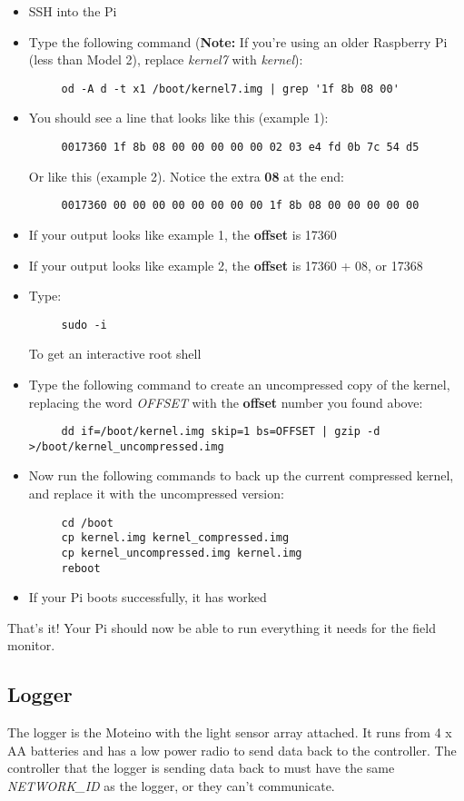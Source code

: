 \documentclass[10pt]{article}
\begin{document}
\begin{itemize}
 \item SSH into the Pi
 \item Type the following command (\textbf{Note:} If you're using an older Raspberry Pi (less than Model 2), replace \textit{kernel7} with \textit{kernel}):
	\begin{verbatim}
	 od -A d -t x1 /boot/kernel7.img | grep '1f 8b 08 00'
	\end{verbatim}
  \item You should see a line that looks like this (example 1):
	\begin{verbatim}
	 0017360 1f 8b 08 00 00 00 00 00 02 03 e4 fd 0b 7c 54 d5
	\end{verbatim}
	Or like this (example 2). Notice the extra \textbf{08} at the end:
	\begin{verbatim}
	 0017360 00 00 00 00 00 00 00 00 1f 8b 08 00 00 00 00 00
	\end{verbatim}
  \item If your output looks like example 1, the \textbf{offset} is 17360
  \item If your output looks like example 2, the \textbf{offset} is 17360 + 08, or 17368
  \item Type:
	\begin{verbatim}
	 sudo -i
	\end{verbatim}
	To get an interactive root shell
  \item Type the following command to create an uncompressed copy of the kernel, replacing the word \textit{OFFSET} with the \textbf{offset} number
	you found above:
	\begin{verbatim}
	 dd if=/boot/kernel.img skip=1 bs=OFFSET | gzip -d >/boot/kernel_uncompressed.img
	\end{verbatim}
  \item Now run the following commands to back up the current compressed kernel, and replace it with the uncompressed version:
	\begin{verbatim}
	 cd /boot
	 cp kernel.img kernel_compressed.img
	 cp kernel_uncompressed.img kernel.img
	 reboot
	\end{verbatim}
  \item If your Pi boots successfully, it has worked
\end{itemize}

That's it! Your Pi should now be able to run everything it needs for the field monitor.

\subsection{Logger}
The logger is the Moteino with the light sensor array attached. It runs from 4 x AA batteries and has a low power radio to send data back to the controller. The controller
that the logger is sending data back to must have the same \textit{NETWORK\_ID} as the logger, or they can't communicate.
\end{document}
